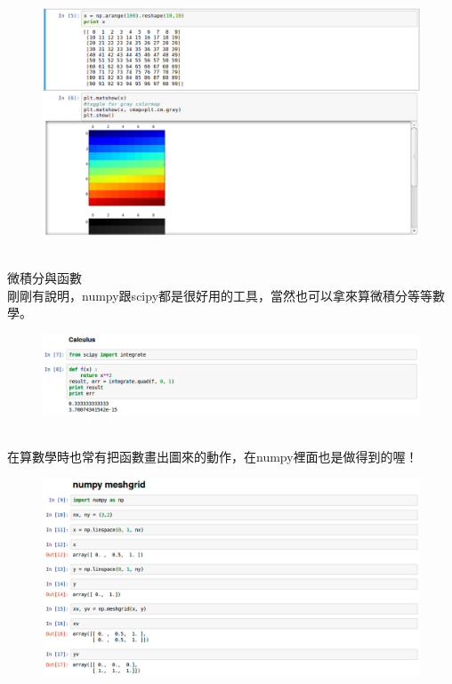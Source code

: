\documentclass{article}
\begin{document}
\begin{figure}[htp]
    \begin{center}
        \includegraphics[width=400pt]{pic/3_1_9.png}
    \end{center}
\end{figure}
\\微積分與函數
\\剛剛有說明，numpy跟scipy都是很好用的工具，當然也可以拿來算微積分等等數學。
\begin{figure}[htp]
    \begin{center}
        \includegraphics[width=400pt]{pic/3_1_10.png}
    \end{center}
\end{figure}
\\
在算數學時也常有把函數畫出圖來的動作，在numpy裡面也是做得到的喔！
\begin{figure}[htp]
    \begin{center}
        \includegraphics[width=400pt]{pic/3_1_11.png}
    \end{center}
\end{figure}
\end{document}
